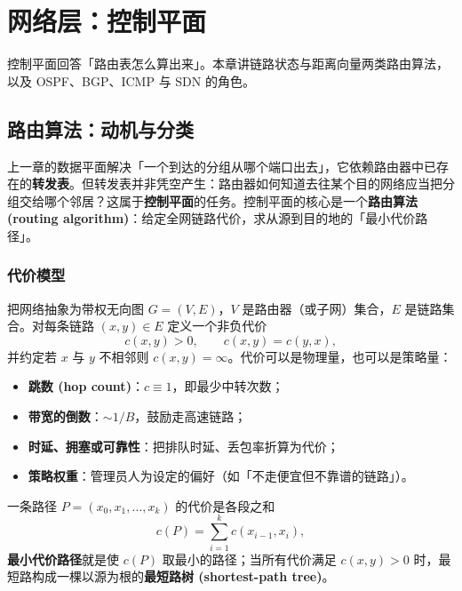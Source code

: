 \clearpage
\begingroup
\let\clearpage\relax
\let\cleardoublepage\relax
\vspace*{\fill}
\chapter{网络层：控制平面}
\begin{center}
控制平面回答「路由表怎么算出来」。本章讲链路状态与距离向量两类路由算法，以及 OSPF、BGP、ICMP 与 SDN 的角色。
\end{center}
\vspace*{\fill}
\endgroup
\clearpage

\section{路由算法：动机与分类}

上一章的数据平面解决「一个到达的分组从哪个端口出去」，它依赖路由器中已存在的\textbf{转发表}。但转发表并非凭空产生：路由器如何知道去往某个目的网络应当把分组交给哪个邻居？这属于\textbf{控制平面}的任务。控制平面的核心是一个\textbf{路由算法 (routing algorithm)}：给定全网链路代价，求从源到目的地的「最小代价路径」。

\subsection{代价模型}

把网络抽象为带权无向图 $G=(V,E)$，$V$ 是路由器（或子网）集合，$E$ 是链路集合。对每条链路 $(x,y)\in E$ 定义一个非负代价
\begin{equation}
    c(x,y) > 0, \qquad c(x,y)=c(y,x),
\end{equation}
并约定若 $x$ 与 $y$ 不相邻则 $c(x,y)=\infty$。代价可以是物理量，也可以是策略量：
\begin{itemize}
    \item \textbf{跳数 (hop count)}：$c\equiv 1$，即最少中转次数；
    \item \textbf{带宽的倒数}：$\sim 1/B$，鼓励走高速链路；
    \item \textbf{时延、拥塞或可靠性}：把排队时延、丢包率折算为代价；
    \item \textbf{策略权重}：管理员人为设定的偏好（如「不走便宜但不靠谱的链路」）。
\end{itemize}

一条路径 $P=(x_0,x_1,\dots,x_k)$ 的代价是各段之和
\begin{equation}
    c(P) = \sum_{i=1}^{k} c(x_{i-1},x_i),
\end{equation}
\textbf{最小代价路径}就是使 $c(P)$ 取最小的路径；当所有代价满足 $c(x,y)>0$ 时，最短路构成一棵以源为根的\textbf{最短路树 (shortest-path tree)}。

